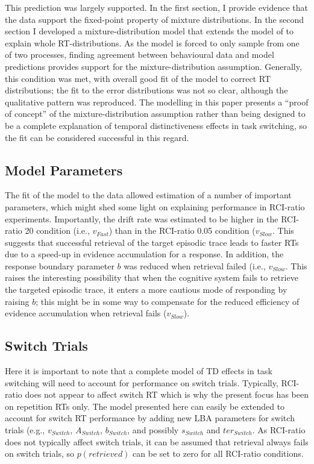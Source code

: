 \documentclass[a4paper, jou, natbib]{apa6}
\begin{document}
This prediction was largely supported. In the first section, I provide evidence that the data support the fixed-point property of mixture distributions. In the second section I developed a mixture-distribution model that extends the model of \cite{Grange2015} to explain whole RT-distributions. As the model is forced to only sample from one of two processes, finding agreement between behavioural data and model predictions provides support for the mixture-distribution assumption. Generally, this condition was met, with overall good fit of the model to correct RT distributions; the fit to the error distributions was not so clear, although the qualitative pattern was reproduced. The modelling in this paper presents a ``proof of concept'' of the mixture-distribution assumption rather than being designed to be a complete explanation of temporal distinctiveness effects in task switching, so the fit can be considered successful in this regard.

\subsection{Model Parameters}
The fit of the model to the data allowed estimation of a number of important parameters, which might shed some light on explaining performance in RCI-ratio experiments. Importantly, the drift rate was estimated to be higher in the RCI-ratio 20 condition (i.e., $v_{Fast}$) than in the RCI-ratio 0.05 condition ($v_{Slow}$. This suggests that successful retrieval of the target episodic trace leads to faster RTs due to a speed-up in evidence accumulation for a response. In addition, the response boundary parameter $b$ was reduced when retrieval failed (i.e., $v_{Slow}$. This raises the interesting possibility that when the cognitive system fails to retrieve the targeted episodic trace, it enters a more cautious mode of responding by raising $b$; this might be in some way to compensate for the reduced efficiency of evidence accumulation when retrieval fails ($v_{Slow}$).
 
\subsection{Switch Trials}
Here it is important to note that a complete model of TD effects in task switching will need to account for performance on switch trials. Typically, RCI-ratio does not appear to affect switch RT \citep{Horoufchin2011, Horoufchin2011a} which is why the present focus has been on repetition RTs only. The model presented here can easily be extended to account for switch RT performance by adding new LBA parameters for switch trials (e.g., $v_{Switch}$, $A_{Switch}$, $b_{Switch}$, and possibly $s_{Switch}$ and  $ter_{Switch}$. As RCI-ratio does not typically affect switch trials, it can be assumed that retrieval always fails on switch trials, so $p(retrieved)$ can be set to zero for all RCI-ratio conditions. 
\end{document}
